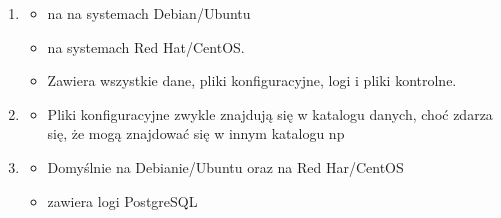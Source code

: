\documentclass[letterpaper,10pt,polish]{sphinxmanual}
\begin{document}
\label{\detokenize{rozdzialy/rozdzial1:lokalizacja}}\begin{enumerate}
%
\item {} \begin{description}
\begin{itemize}
\item {} 
\sphinxAtStartPar
{} na na systemach Debian/Ubuntu

\item {} 
\sphinxAtStartPar
{} na systemach Red Hat/CentOS.

\item {} 
\sphinxAtStartPar
Zawiera wszystkie dane, pliki konfiguracyjne, logi i pliki kontrolne.

\end{itemize}

\end{description}

\item {} \begin{description}
\begin{itemize}
\item {} 
\sphinxAtStartPar
Pliki konfiguracyjne zwykle znajdują się w katalogu danych, choć zdarza się, że mogą znajdować się w innym katalogu np 

\end{itemize}

\end{description}

\item {} \begin{description}
\begin{itemize}
\item {} 
\sphinxAtStartPar
Domyślnie  na Debianie/Ubuntu oraz  na Red Har/CentOS

\item {} 
\sphinxAtStartPar
zawiera logi PostgreSQL

\end{itemize}

\end{description}

\end{enumerate}
\end{document}
